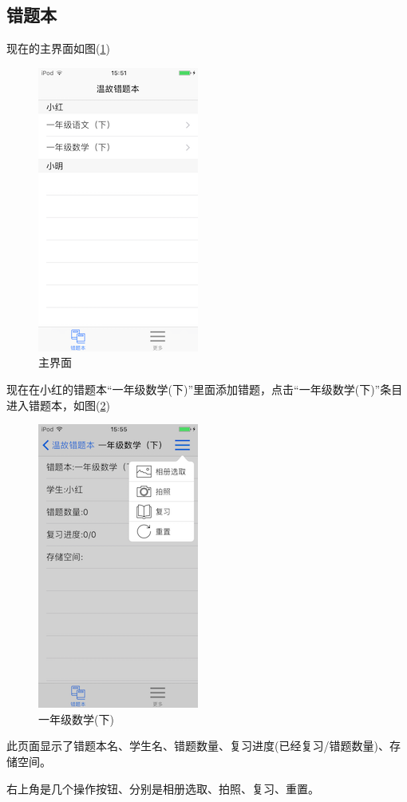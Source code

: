 \subsection{错题本}
现在的主界面如图(\ref{img18})
\begin{figure}[H]
	\centering
	\includegraphics{img/18.png}
	\caption{主界面}
	\label{img18}
\end{figure}
现在在小红的错题本“一年级数学(下)”里面添加错题，点击“一年级数学(下)”条目进入错题本，如图(\ref{img19})
\begin{figure}[H]
	\centering
	\includegraphics{img/19.png}
	\caption{一年级数学(下)}
	\label{img19}
\end{figure}
此页面显示了错题本名、学生名、错题数量、复习进度(已经复习/错题数量)、存储空间。

右上角是几个操作按钮、分别是相册选取、拍照、复习、重置。

